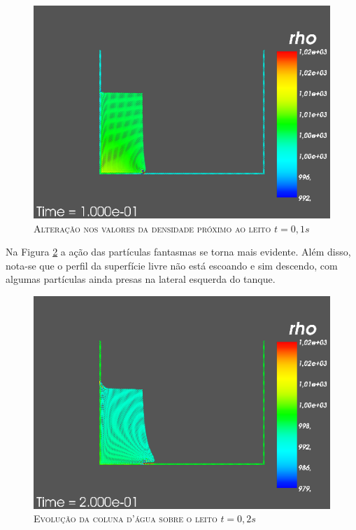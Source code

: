\begin{figure}[H]
	\centering
	\includegraphics[scale=0.5]{figuras/pysph1s.png}
	\caption{\textsc{Alteração nos valores da densidade próximo ao leito $t=0,1s$}}
	\vspace{-0.1cm}
	\label{fig:pysph1s}
\end{figure}

Na Figura \ref{fig:pysph2s} a ação das partículas fantasmas se torna mais evidente. Além disso, nota-se que o perfil da superfície livre não está escoando e sim descendo, com algumas partículas ainda presas na lateral esquerda do tanque. 

\begin{figure}[H]
	\centering
	\includegraphics[scale=0.5]{figuras/pysph2s.png}
	\caption{\textsc{Evolução da coluna d'água sobre o leito $t=0,2s$}}
	\vspace{-0.1cm}
	\label{fig:pysph2s}
\end{figure}

